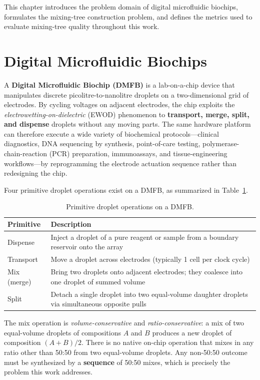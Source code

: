 
This chapter introduces the problem domain of digital microfluidic biochips, formulates the mixing-tree construction problem, and defines the metrics used to evaluate mixing-tree quality throughout this work.

\section{Digital Microfluidic Biochips}

A \textbf{Digital Microfluidic Biochip (DMFB)} is a lab-on-a-chip device that manipulates discrete picolitre-to-nanolitre droplets on a two-dimensional grid of electrodes. By cycling voltages on adjacent electrodes, the chip exploits the \textit{electrowetting-on-dielectric} (EWOD) phenomenon to \textbf{transport, merge, split, and dispense} droplets without any moving parts. The same hardware platform can therefore execute a wide variety of biochemical protocols---clinical diagnostics, DNA sequencing by synthesis, point-of-care testing, polymerase-chain-reaction (PCR) preparation, immunoassays, and tissue-engineering workflows---by reprogramming the electrode actuation sequence rather than redesigning the chip.

Four primitive droplet operations exist on a DMFB, as summarized in Table~\ref{tab:primitives}.

\begin{table}[H]
\centering
\caption{Primitive droplet operations on a DMFB.}
\label{tab:primitives}
\begin{tabular}{|l|p{10cm}|}
\hline
\textbf{Primitive} & \textbf{Description} \\
\hline
Dispense & Inject a droplet of a pure reagent or sample from a boundary reservoir onto the array \\
\hline
Transport & Move a droplet across electrodes (typically 1 cell per clock cycle) \\
\hline
Mix (merge) & Bring two droplets onto adjacent electrodes; they coalesce into one droplet of summed volume \\
\hline
Split & Detach a single droplet into two equal-volume daughter droplets via simultaneous opposite pulls \\
\hline
\end{tabular}
\end{table}

The mix operation is \textit{volume-conservative} and \textit{ratio-conservative}: a mix of two equal-volume droplets of compositions $A$ and $B$ produces a new droplet of composition $(A + B) / 2$. There is no native on-chip operation that mixes in any ratio other than 50:50 from two equal-volume droplets. Any non-50:50 outcome must be synthesized by a \textbf{sequence} of 50:50 mixes, which is precisely the problem this work addresses.


